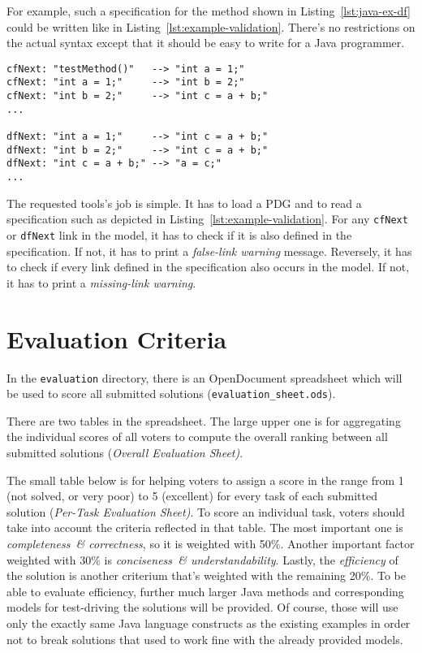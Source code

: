 \documentclass[submission,copyright,creativecommons]{eptcs}
\begin{document}
For example, such a specification for the method shown in
Listing~\ref{lst:java-ex-df} could be written like in
Listing~\ref{lst:example-validation}.  There's no restrictions on the actual
syntax except that it should be easy to write for a Java programmer.

\begin{lstlisting}[caption={An example validation DSL for the PDG of the method shown in Listing~\ref{lst:java-ex-df}},label={lst:example-validation}]
cfNext: "testMethod()"   --> "int a = 1;"
cfNext: "int a = 1;"     --> "int b = 2;"
cfNext: "int b = 2;"     --> "int c = a + b;"
...

dfNext: "int a = 1;"     --> "int c = a + b;"
dfNext: "int b = 2;"     --> "int c = a + b;"
dfNext: "int c = a + b;" --> "a = c;"
...
\end{lstlisting}

The requested tools's job is simple.  It has to load a PDG and to read a
specification such as depicted in Listing~\ref{lst:example-validation}.  For
any \verb|cfNext| or \verb|dfNext| link in the model, it has to check if it is
also defined in the specification.  If not, it has to print a \emph{false-link
  warning} message.  Reversely, it has to check if every link defined in the
specification also occurs in the model.  If not, it has to print a
\emph{missing-link warning}.


\section{Evaluation Criteria}
\label{sec:evaluation-criteria}

In the \verb|evaluation| directory, there is an OpenDocument spreadsheet which
will be used to score all submitted solutions (\verb|evaluation_sheet.ods|).

There are two tables in the spreadsheet.  The large upper one is for
aggregating the individual scores of all voters to compute the overall ranking
between all submitted solutions (\emph{Overall Evaluation Sheet)}.

The small table below is for helping voters to assign a score in the range from
1 (not solved, or very poor) to 5 (excellent) for every task of each submitted
solution (\emph{Per-Task Evaluation Sheet)}.  To score an individual task,
voters should take into account the criteria reflected in that table.  The most
important one is \emph{completeness~\& correctness}, so it is weighted with
50\%.  Another important factor weighted with 30\% is \emph{conciseness~\&
  understandability}.  Lastly, the \emph{efficiency} of the solution is another
criterium that's weighted with the remaining 20\%.  To be able to evaluate
efficiency, further much larger Java methods and corresponding models for
test-driving the solutions will be provided.  Of course, those will use only
the exactly same Java language constructs as the existing examples in order not
to break solutions that used to work fine with the already provided models.
\end{document}
